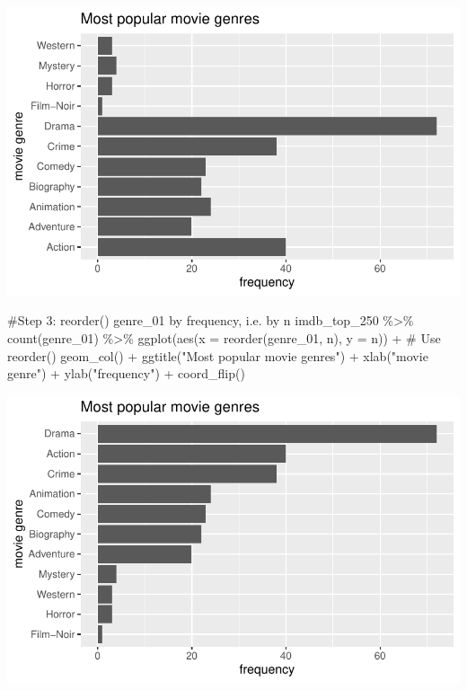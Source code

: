 \documentclass[
  letterpaper,
]{krantz}
\makeatletter
\newenvironment{Shaded}{\begin{snugshade}}{\end{snugshade}}
\newcommand{\AttributeTok}[1]{\textcolor[rgb]{0.40,0.45,0.13}{#1}}
\newcommand{\CommentTok}[1]{\textcolor[rgb]{0.37,0.37,0.37}{#1}}
\newcommand{\FunctionTok}[1]{\textcolor[rgb]{0.28,0.35,0.67}{#1}}
\newcommand{\NormalTok}[1]{\textcolor[rgb]{0.00,0.23,0.31}{#1}}
\newcommand{\SpecialCharTok}[1]{\textcolor[rgb]{0.37,0.37,0.37}{#1}}
\newcommand{\StringTok}[1]{\textcolor[rgb]{0.13,0.47,0.30}{#1}}
\newenvironment{kframe}{%
\medskip{}
\setlength{\fboxsep}{.8em}
 \def\at@end@of@kframe{}%
 \ifinner\ifhmode%
  \def\at@end@of@kframe{\end{minipage}}%
  \begin{minipage}{\columnwidth}%
 \fi\fi%
 \def\FrameCommand##1{\hskip\@totalleftmargin \hskip-\fboxsep
 \colorbox{shadecolor}{##1}\hskip-\fboxsep
     \hskip-\linewidth \hskip-\@totalleftmargin \hskip\columnwidth}%
 \MakeFramed {\advance\hsize-\width
   \@totalleftmargin\z@ \linewidth\hsize
   \@setminipage}}%
 {\par\unskip\endMakeFramed%
 \at@end@of@kframe}
\renewenvironment{Shaded}{\begin{kframe}}{\end{kframe}}
\makeatother
\begin{document}
\includegraphics{08_descriptive_statistics_files/figure-pdf/unnamed-chunk-7-1.pdf}

\begin{Shaded}
\begin{Highlighting}[]
\CommentTok{\#Step 3: reorder() genre\_01 by frequency, i.e. by \textquotesingle{}n\textquotesingle{}}
\NormalTok{imdb\_top\_250 }\SpecialCharTok{\%\textgreater{}\%}
  \FunctionTok{count}\NormalTok{(genre\_01) }\SpecialCharTok{\%\textgreater{}\%}
  \FunctionTok{ggplot}\NormalTok{(}\FunctionTok{aes}\NormalTok{(}\AttributeTok{x =} \FunctionTok{reorder}\NormalTok{(genre\_01, n), }\AttributeTok{y =}\NormalTok{ n)) }\SpecialCharTok{+}  \CommentTok{\# Use \textquotesingle{}reorder()\textquotesingle{}}
  \FunctionTok{geom\_col}\NormalTok{() }\SpecialCharTok{+}
  \FunctionTok{ggtitle}\NormalTok{(}\StringTok{"Most popular movie genres"}\NormalTok{) }\SpecialCharTok{+}
  \FunctionTok{xlab}\NormalTok{(}\StringTok{"movie genre"}\NormalTok{) }\SpecialCharTok{+}
  \FunctionTok{ylab}\NormalTok{(}\StringTok{"frequency"}\NormalTok{) }\SpecialCharTok{+}
  \FunctionTok{coord\_flip}\NormalTok{()}
\end{Highlighting}
\end{Shaded}

\includegraphics{08_descriptive_statistics_files/figure-pdf/unnamed-chunk-8-1.pdf}
\end{document}
